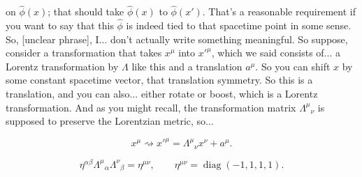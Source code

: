 
\noindent
on $\hat\phi(x)$; that should take $\hat\phi(x)$ to $\hat\phi(x')$. That's a reasonable requirement if you want to say that this $\hat\phi$ is indeed tied to that spacetime point in some sense. So, [unclear phrase], I...
don't actually write something meaningful. So suppose, consider a transformation that takes $x^\mu$ into $x'^\mu$, which we said consists of...
a Lorentz transformation by $\Lambda$ like this and a translation $a^\mu$. So you can shift $x$ by some constant spacetime vector, that translation symmetry. So this is a translation, and you can also...
either rotate or boost, which is a Lorentz transformation. And as you might recall, the transformation matrix $\Lambda^\mu{}_\nu$ is supposed to preserve the Lorentzian metric, so...

\[
  x^\mu\rightsquigarrow x'^\mu
  =\Lambda^\mu{}_{\nu}x^\nu+a^\mu.
\]

\[
  \eta^{\alpha\beta}\Lambda^\mu{}_{\alpha}\Lambda^\nu{}_{\beta}
  =\eta^{\mu\nu},
  \qquad
  \eta^{\mu\nu}=\operatorname{diag}(-1,1,1,1).
\]

